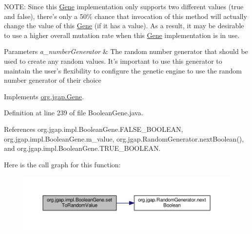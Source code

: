 N\-O\-T\-E\-: Since this \hyperlink{interfaceorg_1_1jgap_1_1_gene}{Gene} implementation only supports two different values (true and false), there's only a 50\% chance that invocation of this method will actually change the value of this \hyperlink{interfaceorg_1_1jgap_1_1_gene}{Gene} (if it has a value). As a result, it may be desirable to use a higher overall mutation rate when this \hyperlink{interfaceorg_1_1jgap_1_1_gene}{Gene} implementation is in use.


\begin{DoxyParams}{Parameters}
{\em a\-\_\-number\-Generator} & The random number generator that should be used to create any random values. It's important to use this generator to maintain the user's flexibility to configure the genetic engine to use the random number generator of their choice \\
\hline
\end{DoxyParams}


Implements \hyperlink{interfaceorg_1_1jgap_1_1_gene_a4ef135da7549ee98139928e21adb841a}{org.\-jgap.\-Gene}.



Definition at line 239 of file Boolean\-Gene.\-java.



References org.\-jgap.\-impl.\-Boolean\-Gene.\-F\-A\-L\-S\-E\-\_\-\-B\-O\-O\-L\-E\-A\-N, org.\-jgap.\-impl.\-Boolean\-Gene.\-m\-\_\-value, org.\-jgap.\-Random\-Generator.\-next\-Boolean(), and org.\-jgap.\-impl.\-Boolean\-Gene.\-T\-R\-U\-E\-\_\-\-B\-O\-O\-L\-E\-A\-N.



Here is the call graph for this function\-:
\nopagebreak
\begin{figure}[H]
\begin{center}
\leavevmode
\includegraphics[width=350pt]{classorg_1_1jgap_1_1impl_1_1_boolean_gene_a21dd7e5973db3e3a32745d3e2e3dcbb0_cgraph}
\end{center}
\end{figure}


